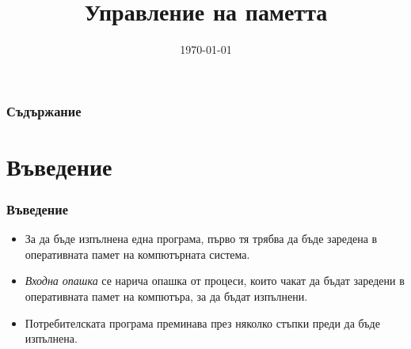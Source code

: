 \documentclass[ignorenonframetext, hyperref=unicode]{beamer}
\title[Памет {(\em\rcsInfoRevision)}]{Управление на паметта}
\date{\today}
\begin{document}
\frame{\maketitle}

\begin{frame}
\frametitle{Съдържание}
\tableofcontents %
\end{frame}

\section{Въведение}

\begin{frame}
\frametitle{Въведение}
\begin{itemize}
  \item За да бъде изпълнена една програма, първо тя трябва да бъде заредена в
  оперативната памет на компютърната система.
  \item {\em Входна опашка} се нарича опашка от процеси, които чакат да бъдат
  заредени в оперативната памет на компютъра, за да бъдат изпълнени.
  \item Потребителската програма преминава през няколко стъпки преди да бъде
  изпълнена.
\end{itemize}
\end{frame}
\end{document}
